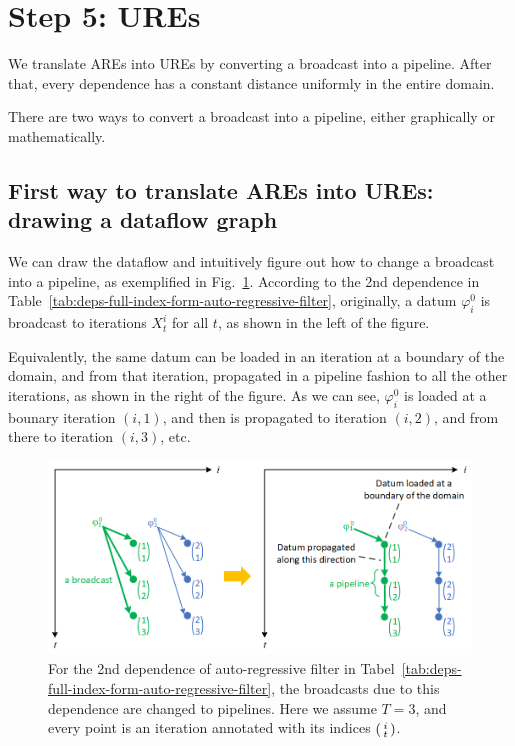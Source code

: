 \section{Step 5: UREs}

We translate AREs into UREs by converting a broadcast into a pipeline. After that, every dependence has a constant distance uniformly in the entire domain.

There are two ways to convert a broadcast into a pipeline, either graphically or mathematically. 

\subsection{First way to translate AREs into UREs: drawing a dataflow graph}
\label{sec:are-to-ures-with-dfg}

We can draw the dataflow and intuitively figure out how to change a broadcast into a pipeline, as exemplified in Fig.~\ref{fig:broadcast-to-pipeline-arf}. According to the 2nd dependence in Table~\ref{tab:deps-full-index-form-auto-regressive-filter}, originally, a datum $\varphi_i^0$ is broadcast to iterations $X_t^i$ for all $t$, as shown in the left of the figure. 

Equivalently, the same datum can be loaded in an iteration at a boundary of the domain, and from that iteration, propagated in a pipeline fashion to all the other iterations, as shown in the right of the figure. As we can see, $\varphi_i^0$ is  loaded at a bounary iteration $(i, 1)$, and then is propagated to iteration $(i, 2)$, and from there to iteration $(i, 3)$, etc. 

\begin{figure}[!ht]
    \centering
    \includegraphics[width=\textwidth]{./img/broadcast-to-pipeline-arf.png}
    \caption{For the 2nd dependence of auto-regressive filter in Tabel~\ref{tab:deps-full-index-form-auto-regressive-filter}, the broadcasts due to this dependence are changed to pipelines. Here we assume $T=3$, and every point is an iteration annotated with its indices $\begin{psmallmatrix} i\\ t\end{psmallmatrix}$.}
    \label{fig:broadcast-to-pipeline-arf}
\end{figure}


